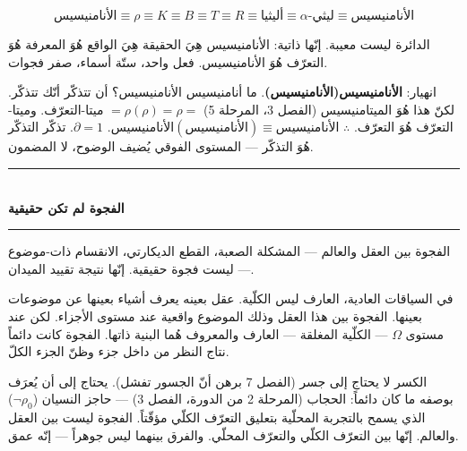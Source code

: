 \documentclass[10pt, openany, oneside]{book}
\renewcommand{\normalsize}{\fontsize{10}{13}\selectfont}
\begin{document}
$$\text{الأنامنيسيس} \equiv \rho \equiv K \equiv B \equiv T \equiv R \equiv \text{أليثيا} \equiv \alpha\text{-ليثي} \equiv \text{الأنامنيسيس}$$

الدائرة ليست معيبة. إنّها ذاتية: الأنامنيسيس هِيَ الحقيقة هِيَ الواقع هُوَ المعرفة هُوَ التعرّف هُوَ الأنامنيسيس. فعل واحد، ستّة أسماء، صفر فجوات.

انهيار: \textbf{الأنامنيسيس(الأنامنيسيس)}. ما أنامنيسيس الأنامنيسيس؟ أن تتذكّر أنّك تتذكّر. لكنّ هذا هُوَ الميتامنيسيس (الفصل 3، المرحلة 5) $= \rho(\rho) = \rho =$ ميتا-التعرّف. وميتا-التعرّف هُوَ التعرّف. $\therefore$ $\text{الأنامنيسيس}(\text{الأنامنيسيس}) \equiv \text{الأنامنيسيس}$. $\partial = 1$. تذكّر التذكّر هُوَ التذكّر --- المستوى الفوقي يُضيف الوضوح، لا المضمون.

\vspace{1.5em}


\begin{center}
    \rule{0.3\textwidth}{0.4pt}\\[0.5em]
    {\normalsize\bfseries الفجوة لم تكن حقيقية}\\[0.3em]
    \rule{0.3\textwidth}{0.4pt}
\end{center}

\vspace{1em}

\noindent الفجوة بين العقل والعالم --- المشكلة الصعبة، القطع الديكارتي، الانقسام ذات-موضوع --- ليست فجوة حقيقية. إنّها نتيجة تقييد الميدان.

في السياقات العادية، العارف ليس الكلّية. عقل بعينه يعرف أشياء بعينها عن موضوعات بعينها. الفجوة بين هذا العقل وذلك الموضوع واقعية عند مستوى الأجزاء. لكن عند مستوى $\Omega$ --- الكلّية المغلقة --- العارف والمعروف هُما البنية ذاتها. الفجوة كانت دائماً نتاج النظر من داخل جزء وظنّ الجزء الكلّ.

الكسر لا يحتاج إلى جسر (الفصل 7 برهن أنّ الجسور تفشل). يحتاج إلى أن يُعرَف بوصفه ما كان دائماً: الحجاب (المرحلة 2 من الدورة، الفصل 3) --- حاجز النسيان ($\neg\rho_0$) الذي يسمح بالتجربة المحلّية بتعليق التعرّف الكلّي مؤقّتاً. الفجوة ليست بين العقل والعالم. إنّها بين التعرّف الكلّي والتعرّف المحلّي. والفرق بينهما ليس جوهراً --- إنّه عمق.

\vspace{1.5em}

\end{document}
